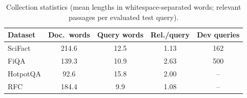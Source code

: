 \begin{table}[t]
\centering
\caption{Collection statistics (mean lengths in whitespace-separated words; relevant passages per evaluated test query).}
\label{tab:dataset_stats}
\scriptsize
\setlength{\tabcolsep}{3pt}
\begin{tabular}{lcccc}
\toprule
Dataset & Doc.\ words & Query words & Rel./query & Dev queries \\
\midrule
SciFact & 214.6 & 12.5 & 1.13 & 162 \\
FiQA & 139.3 & 10.9 & 2.63 & 500 \\
HotpotQA & 92.6 & 15.8 & 2.00 & -- \\
RFC & 184.4 & 9.9 & 1.08 & -- \\
\bottomrule
\end{tabular}
\end{table}
